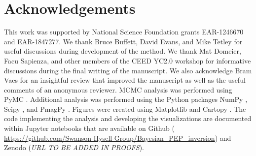 \documentclass[11pt,letterpaper]{article}
\begin{document}
\section*{Acknowledgements}
\label{sec:acknowledgements}
This work was supported by National Science Foundation grants EAR-1246670 and EAR-1847277. We thank Bruce Buffett, David Evans, and Mike Tetley for useful discussions during development of the method. We thank Mat Domeier, Facu Sapienza, and other members of the CEED YC2.0 workshop for informative discussions during the final writing of the manuscript. We also acknowledge Bram Vaes for an insightful review that improved the manuscript as well as the useful comments of an anonymous reviewer. MCMC analysis was performed using PyMC \citep{Salvatier2016a}. Additional analysis was performed using the Python packages NumPy \citep{Harris2020a}, Scipy \citep{Virtanen2020a}, and PmagPy \citep{Tauxe2016a}. Figures were created using Matplotlib \citep{Hunter2007a} and Cartopy \citep{Met-Office2010a}. The code implementing the analysis and developing the visualizations are documented within Jupyter notebooks \citep{Kluyver2016a} that are available on Github ( \url{https://github.com/Swanson-Hysell-Group/Bayesian_PEP_inversion}) and Zenodo (\textit{URL TO BE ADDED IN PROOFS}).

\footnotesize

\singlespacing



\end{document}

